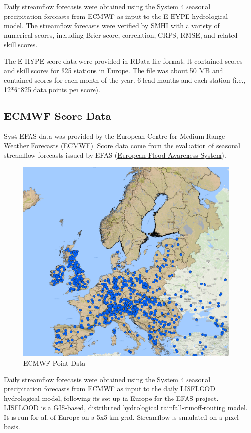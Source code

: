 \documentclass[logos,parttoc,morelanguage=french,morelanguage=german]{orsay-memoire}
\begin{document}
Daily streamflow forecasts were obtained using the System 4 seasonal precipitation forecasts from ECMWF as input to the E-HYPE hydrological model. The streamflow forecasts were verified by SMHI with a variety of numerical scores, including Brier score, correlation, CRPS, RMSE, and related skill scores.

The E-HYPE score data were provided in RData file format. It contained scores and skill scores for 825 stations in Europe. The file was about 50 MB and contained scores for each month of the year, 6 lead months and each station (i.e., 12*6*825 data points per score).

\subsection{ECMWF Score Data}

\gls{Sys4-EFAS} data was provided by the European Centre for Medium-Range Weather Forecasts (\href{http://www.ecmwf.int}{ECMWF}). Score data come from the evaluation of seasonal streamflow forecasts issued by EFAS (\href{https://www.efas.eu/about-efas.html}{European Flood Awareness System}).

\begin{figure}[H]
\centering
\includegraphics[width=0.8\linewidth]{images/gisEFASpoints.png}
  \caption{ECMWF Point Data}
  \label{fig:ECMWFdata}
\end{figure}

Daily streamflow forecasts were obtained using the System 4 seasonal precipitation forecasts from ECMWF as input to the daily LISFLOOD hydrological model, following its set up in Europe for the EFAS project. LISFLOOD is a GIS-based, distributed hydrological rainfall-runoff-routing model. It is run for all of Europe on a 5x5 km grid. Streamflow is simulated on a pixel basis.
\end{document}
